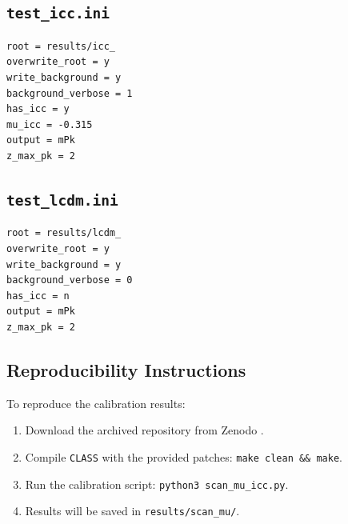 \documentclass[11pt,a4paper]{article}
\newcommand{\class}{\texttt{CLASS}}
\newcommand{\code}[1]{\texttt{#1}}
\begin{document}
\subsection{\code{test\_icc.ini}}
\begin{verbatim}
root = results/icc_
overwrite_root = y
write_background = y
background_verbose = 1
has_icc = y
mu_icc = -0.315
output = mPk
z_max_pk = 2
\end{verbatim}

\subsection{\code{test\_lcdm.ini}}
\begin{verbatim}
root = results/lcdm_
overwrite_root = y
write_background = y
background_verbose = 0
has_icc = n
output = mPk
z_max_pk = 2
\end{verbatim}

\subsection{Reproducibility Instructions}
To reproduce the calibration results:
\begin{enumerate}
    \item Download the archived repository from Zenodo \cite{gimranov2026roadmap}.
    \item Compile \class{} with the provided patches: \code{make clean && make}.
    \item Run the calibration script: \code{python3 scan_mu_icc.py}.
    \item Results will be saved in \code{results/scan_mu/}.
\end{enumerate}
\end{document}
